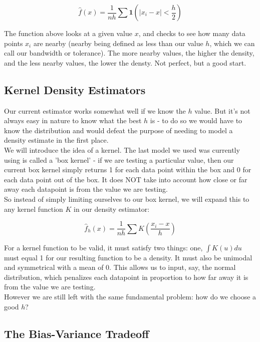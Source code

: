 \documentclass[12pt]{article}
\begin{document}
$$ \hat{f}(x) = \frac{1}{nh} \sum \mathbf{1} (|x_i - x| < \frac{h}{2}) $$

The function above looks at a given value $x$, and checks to see how many data points $x_i$ are nearby (nearby being defined as less than our value $h$, which we can call our bandwidth or tolerance). The more nearby values, the higher the density, and the less nearby values, the lower the densty. Not perfect, but a good start.

\subsection{Kernel Density Estimators}

Our current estimator works somewhat well if we know the $h$ value. But it's not always easy in nature to know what the best $h$ is - to do so we would have to know the distribution and would defeat the purpose of needing to model a density estimate in the first place. \\

We will introduce the idea of a kernel. The last model we used was currently using is called a 'box kernel' - if we are testing a particular value, then our current box kernel simply returns 1 for each data point within the box and 0 for each data point out of the box. It does NOT take into account how close or far away each datapoint is from the value we are testing. \\

So instead of simply limiting ourselves to our box kernel, we will expand this to any kernel function $K$ in our density estimator: 

$$ \hat{f}_h(x) = \frac{1}{nh} \sum K (\frac{x_i - x}{h}) $$

For a kernel function to be valid, it must satisfy two things: one, $ \int K(u)du$ must equal 1 for our resulting function to be a density. It must also be unimodal and symmetrical with a mean of 0. This allows us to input, say, the normal distribution, which penalizes each datapoint in proportion to how far away it is from the value we are testing. \\

However we are still left with the same fundamental problem: how do we choose a good $h$?

\subsection{The Bias-Variance Tradeoff}
\end{document}

